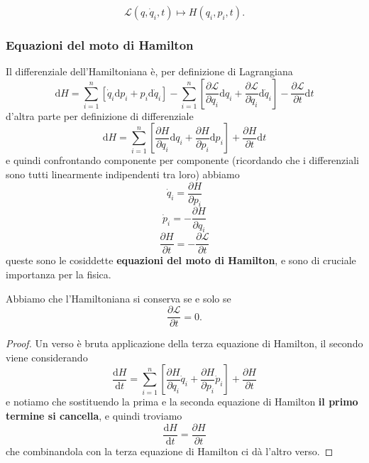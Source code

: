 \documentclass[11pt]{scrartcl}
\newcommand{\dif}{\text{d}}
\begin{document}
	$$\mathcal{L}(q,\dot{q}_i,t)\mapsto H(q_i,p_i,t).$$
	\subsubsection{Equazioni del moto di Hamilton}
	Il differenziale dell'Hamiltoniana è, per definizione di Lagrangiana
	$$\dif H=\sum_{i=1}^{n}\left[\dot{q}_i\dif p_i+p_i\dif \dot{q}_i\right]-\sum_{i=1}^{n}\left[\frac{\partial \mathcal{L}}{\partial q_i}\dif q_i +\frac{\partial \mathcal{L}}{\partial \dot{q}_i}\dif \dot{q}_i\right]-\frac{\partial \mathcal{L}}{\partial t}\dif t$$
	d'altra parte per definizione di differenziale
	$$\dif H=\sum_{i=1}^{n}\left[\frac{\partial H}{\partial q_i}\dif q_i+\frac{\partial H}{\partial p_i}\dif p_i\right]+\frac{\partial H}{\partial t}\dif t$$
	e quindi confrontando componente per componente (ricordando che i differenziali sono tutti linearmente indipendenti tra loro) abbiamo
	$$\dot{q}_i=\frac{\partial H}{\partial p_i}$$
	$$\dot{p}_i=-\frac{\partial H}{\partial q_i}$$
	$$\frac{\partial H}{\partial t}=-\frac{\partial \mathcal{L}}{\partial t}$$
	queste sono le cosiddette \textbf{equazioni del moto di Hamilton}, e sono di cruciale importanza per la fisica.
	\begin{lemma}
		Abbiamo che l'Hamiltoniana si conserva se e solo se 
		$$\frac{\partial \mathcal{L}}{\partial t}=0.$$
	\end{lemma}
	\begin{proof}
		Un verso è bruta applicazione della terza equazione di Hamilton, il secondo viene considerando
		$$\frac{\dif H}{\dif t}=\sum_{i=1}^{n}\left[\frac{\partial H}{\partial q_i} \dot{q}_i+\frac{\partial H}{\partial p_i} \dot{p}_i\right]+\frac{\partial H}{\partial t}$$
		e notiamo che sostituendo la prima e la seconda equazione di Hamilton \textbf{il primo termine si cancella}, e quindi troviamo
		$$\frac{\dif H}{\dif t}=\frac{\partial H}{\partial t}$$
		che combinandola con la terza equazione di Hamilton ci dà l'altro verso.
	\end{proof}
\end{document}
